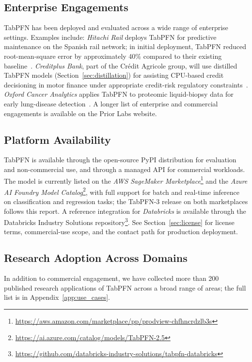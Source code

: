 \subsection{Enterprise Engagements}

TabPFN has been deployed and evaluated across a wide range of enterprise settings. Examples include: \textit{Hitachi Rail} deploys TabPFN for predictive maintenance on the Spanish rail network; in initial deployment, TabPFN reduced root-mean-square error by approximately 40\% compared to their existing baseline~\citep{hitachi_case_study}. \textit{Creditplus Bank}, part of the Cr\'{e}dit Agricole group, will use distilled TabPFN models (Section~\ref{sec:distillation}) for assisting CPU-based credit decisioning in motor finance under appropriate credit-risk regulatory constraints~\citep{creditplus_case_study}. \textit{Oxford Cancer Analytics} applies TabPFN to proteomic liquid-biopsy data for early lung-disease detection~\citep{oxcan_case_study}. A longer list of enterprise and commercial engagements is available on the Prior Labs website.

\subsection{Platform Availability}

TabPFN is available through the open-source PyPI distribution for evaluation and non-commercial use, and through a managed API for commercial workloads. The model is currently listed on the \textit{AWS SageMaker Marketplace}\footnote{\url{https://aws.amazon.com/marketplace/pp/prodview-chfhncrdzlb3s}} and the \textit{Azure AI Foundry Model Catalog}\footnote{\url{https://ai.azure.com/catalog/models/TabPFN-2.5}}, with full support for batch and real-time inference on classification and regression tasks; the TabPFN-3 release on both marketplaces follows this report. A reference integration for \textit{Databricks} is available through the Databricks Industry Solutions repository\footnote{\url{https://github.com/databricks-industry-solutions/tabpfn-databricks}}. See Section~\ref{sec:license} for license terms, commercial-use scope, and the contact path for production deployment.

\subsection{Research Adoption Across Domains}

In addition to commercial engagement, we have collected more than 200 published research applications of TabPFN across a broad range of areas; the full list is in Appendix~\ref{app:use_cases}.


